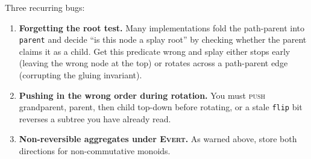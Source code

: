 \begin{trapbox}
Three recurring bugs:
\begin{enumerate}
  \item \textbf{Forgetting the root test.} Many implementations fold the
        path-parent into \texttt{parent} and decide ``is this node a splay root''
        by checking whether the parent claims it as a child. Get this predicate
        wrong and splay either stops early (leaving the wrong node at the top) or
        rotates across a path-parent edge (corrupting the gluing invariant).
  \item \textbf{Pushing in the wrong order during rotation.} You must \textsc{push}
        grandparent, parent, then child top-down before rotating, or a stale
        \texttt{flip} bit reverses a subtree you have already read.
  \item \textbf{Non-reversible aggregates under \textsc{Evert}.} As warned above,
        store both directions for non-commutative monoids.
\end{enumerate}
\end{trapbox}

